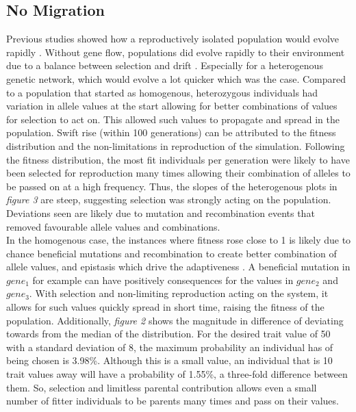 \subsection{No Migration}
Previous studies showed how a reproductively isolated population would evolve rapidly \cite{garcia1997genetic}. Without gene flow, populations did evolve rapidly to their environment due to a balance between selection and drift \cite{garcia1997genetic,tigano2016genomics,barber1999patterns}. Especially for a heterogenous genetic network, which would evolve a lot quicker which was the case. Compared to a population that started as homogenous, heterozygous individuals had variation in allele values at the start allowing for better combinations of values for selection to act on. This allowed such values to propagate and spread in the population. Swift rise (within 100 generations) can be attributed to the fitness distribution and the non-limitations in reproduction of the simulation. Following the fitness distribution, the most fit individuals per generation were likely to have been selected for reproduction many times allowing their combination of alleles to be passed on at a high frequency. Thus, the slopes of the heterogenous plots in \textit{figure 3} are steep, suggesting selection was strongly acting on the population. Deviations seen are likely due to mutation and recombination events that removed favourable allele values and combinations.\\
In the homogenous case, the instances where fitness rose close to 1 is likely due to chance beneficial mutations and recombination to create better combination of allele values, and epistasis which drive the adaptiveness \cite{tigano2016genomics}. A beneficial mutation in $gene_1$ for example can have positively consequences for the values in $gene_2$ and $gene_3$. With selection and non-limiting reproduction acting on the system, it allows for such values quickly spread in short time, raising the fitness of the population. Additionally, \textit{figure 2} shows the magnitude in difference of deviating towards from the median of the distribution. For the desired trait value of 50 with a standard deviation of 8, the maximum probability an individual has of being chosen is 3.98\%. Although this is a small value, an individual that is 10 trait values away will have a probability of 1.55\%, a three-fold difference between them. So, selection and limitless parental contribution allows even a small number of fitter individuals to be parents many times and pass on their values.
